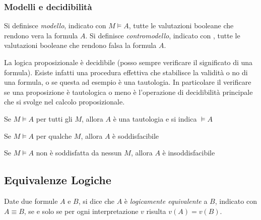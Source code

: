 \documentclass[a4paper,12pt, oneside]{book}
\begin{document}
\subsubsection{Modelli e decidibilità}
Si definisce \emph{modello}, indicato con $M \models A$, tutte le valutazioni
booleane 
che rendono vera la formula $A$.
Si definisce \emph{contromodello}, indicato con , tutte le valutazioni booleane
che rendono falsa la formula $A$.

La logica proposizionale è decidibile (posso sempre verificare il significato di
una formula). 
Esiste infatti una procedura effettiva che stabilisce la validità o no di una
formula, o se questa 
ad esempio è una tautologia.
In particolare il verificare se una proposizione è tautologica o meno è
l’operazione di decidibilità principale che si svolge nel calcolo
proposizionale. 

\begin{definizione}
  Se $M \models A$ per tutti gli $M$, allora $A$ è una tautologia e si indica
  $\models A$ 
\end{definizione}

\begin{definizione}
  Se $M \models A$ per qualche $M$, allora $A$ è soddisfacibile
\end{definizione}

\begin{definizione}
  Se $M \models A$ non è soddisfatta da nessun $M$, allora $A$ è
  insoddisfacibile 
\end{definizione}
\subsection{Equivalenze Logiche}
\begin{defi}
  Date due formule $A$ e $B$, si dice che $A$ è \emph{logicamente equivalente} a
  $B$, 
  indicato con $A \equiv B$, se e solo se per ogni interpretazione $v$ risulta
  $v(A) = v(B)$. 
\end{defi}
\end{document}
